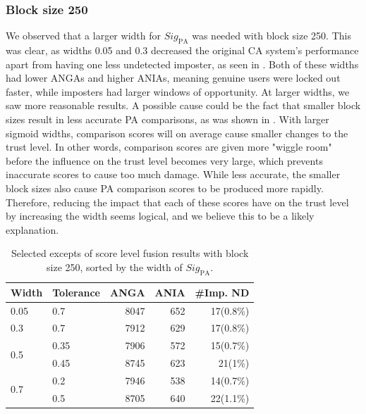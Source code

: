 

\subsubsection{Block size 250}
We observed that a larger width for $\textit{Sig}_{\text{PA}}$ was needed with block size 250.
This was clear, as widths 0.05 and 0.3 decreased the original CA system's performance apart from having one less undetected imposter, as seen in .
Both of these widths had lower ANGAs and higher ANIAs, meaning genuine users were locked out faster, while imposters had larger windows of opportunity.
At larger widths, we saw more reasonable results.
A possible cause could be the fact that smaller block sizes result in less accurate PA comparisons, as was shown in .
With larger sigmoid widths, comparison scores will on average cause smaller changes to the trust level. 
In other words, comparison scores are given more "wiggle room" before the influence on the trust level becomes very large, which prevents inaccurate scores to cause too much damage.
While less accurate, the smaller block sizes also cause PA comparison scores to be produced more rapidly.
Therefore, reducing the impact that each of these scores have on the trust level by increasing the width seems logical, and we believe this to be a likely explanation.

\begin{table}[htbp]
\centering
\begin{tabular}{llrrr}
\hline
\textbf{Width}        & \textbf{Tolerance} & \textbf{ANGA} & \textbf{ANIA} & \textbf{\#Imp. ND} \\ \hline
0.05                 & 0.7                & 8047          & 652           & 17(0.8\%)          \\ \hline
0.3                  & 0.7                & 7912          & 629           & 17(0.8\%)          \\ \hline
\multirow{2}{*}{0.5} & 0.35               & 7906          & 572           & 15(0.7\%)          \\
                     & 0.45               & 8745          & 623           & 21(1\%)            \\ \hline
\multirow{2}{*}{0.7} & 0.2                & 7946          & 538           & 14(0.7\%)          \\
                     & 0.5                & 8705          & 640           & 22(1.1\%)          \\ \hline
\end{tabular}
\caption{Selected excepts of score level fusion results with block size 250, sorted by the width of $\textit{Sig}_{\text{PA}}$.}
\label{tab:analysis-score-level-BL250}
\end{table}


